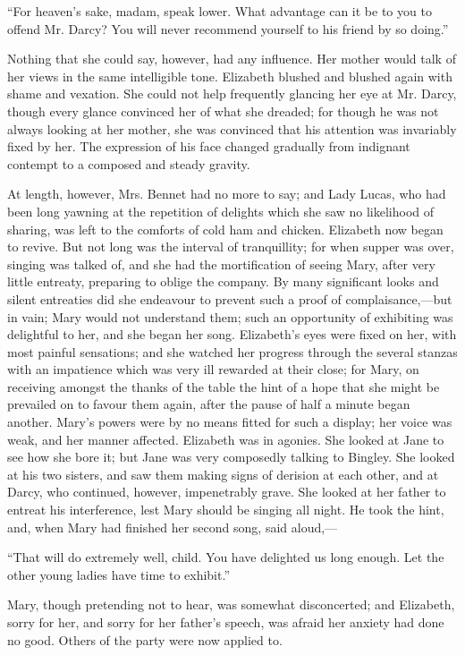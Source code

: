 \documentclass[12pt]{book}
\begin{document}
``For heaven's sake, madam, speak lower. What advantage can it be to you to offend Mr. Darcy? You will never recommend yourself to his friend by so doing.''

Nothing that she could say, however, had any influence. Her mother would talk of her views in the same intelligible tone. Elizabeth blushed and blushed again with shame and vexation. She could not help frequently glancing her eye at Mr. Darcy, though every glance convinced her of what she dreaded; for though he was not always looking at her mother, she was convinced that his attention was invariably fixed by her. The expression of his face changed gradually from indignant contempt to a composed and steady gravity.

At length, however, Mrs. Bennet had no more to say; and Lady Lucas, who had been long yawning at the repetition of delights which she saw no likelihood of sharing, was left to the comforts of cold ham and chicken. Elizabeth now began to revive. But not long was the interval of tranquillity; for when supper was over, singing was talked of, and she had the mortification of seeing Mary, after very little entreaty, preparing to oblige the company. By many significant looks and silent entreaties did she endeavour to prevent such a proof of complaisance,---but in vain; Mary would not understand them; such an opportunity of exhibiting was delightful to her, and she began her song. Elizabeth's eyes were fixed on her, with most painful sensations; and she watched her progress through the several stanzas with an impatience which was very ill rewarded at their close; for Mary, on receiving amongst the thanks of the table the hint of a hope that she might be prevailed on to favour them again, after the pause of half a minute began another. Mary's powers were by no means fitted for such a display; her voice was weak, and her manner affected. Elizabeth was in agonies. She looked at Jane to see how she bore it; but Jane was very composedly talking to Bingley. She looked at his two sisters, and saw them making signs of derision at each other, and at Darcy, who continued, however, impenetrably grave. She looked at her father to entreat his interference, lest Mary should be singing all night. He took the hint, and, when Mary had finished her second song, said aloud,---

``That will do extremely well, child. You have delighted us long enough. Let the other young ladies have time to exhibit.''

Mary, though pretending not to hear, was somewhat disconcerted; and Elizabeth, sorry for her, and sorry for her father's speech, was afraid her anxiety had done no good. Others of the party were now applied to.
\end{document}
